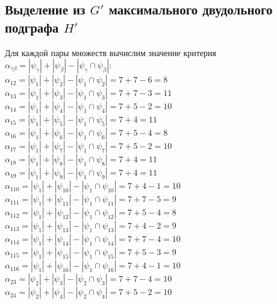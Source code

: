 \documentclass[12pt,a4paper]{report}
\begin{document}
\subsection*{Выделение из $G'$ максимального двудольного подграфа $H'$}
Для каждой пары множеств вычислим значение критерия \\
$\alpha_{\gamma\beta} = |\psi_\gamma| + |\psi_\beta| - |\psi_\gamma \cap \psi_\beta|$:\\
\hfill\break
$\alpha_{12} = |\psi_{1}| + |\psi_{2}| - |\psi_{1} \cap \psi_{2}| = 7 + 7 - 6 = 8$ \\
$\alpha_{13} = |\psi_{1}| + |\psi_{3}| - |\psi_{1} \cap \psi_{3}| = 7 + 7 - 3 = 11$ \\
$\alpha_{14} = |\psi_{1}| + |\psi_{4}| - |\psi_{1} \cap \psi_{4}| = 7 + 5 - 2 = 10$ \\
$\alpha_{15} = |\psi_{1}| + |\psi_{5}| - |\psi_{1} \cap \psi_{5}| = 7 + 4 = 11$ \\
$\alpha_{16} = |\psi_{1}| + |\psi_{6}| - |\psi_{1} \cap \psi_{6}| = 7 + 5 - 4 = 8$ \\
$\alpha_{17} = |\psi_{1}| + |\psi_{7}| - |\psi_{1} \cap \psi_{7}| = 7 + 5 - 2 = 10$ \\
$\alpha_{18} = |\psi_{1}| + |\psi_{8}| - |\psi_{1} \cap \psi_{8}| = 7 + 4 = 11$ \\
$\alpha_{19} = |\psi_{1}| + |\psi_{9}| - |\psi_{1} \cap \psi_{9}| = 7 + 4 = 11$ \\
$\alpha_{110} = |\psi_{1}| + |\psi_{10}| - |\psi_{1} \cap \psi_{10}| = 7 + 4 - 1 = 10$ \\
$\alpha_{111} = |\psi_{1}| + |\psi_{11}| - |\psi_{1} \cap \psi_{11}| = 7 + 7 - 5 = 9$ \\
$\alpha_{112} = |\psi_{1}| + |\psi_{12}| - |\psi_{1} \cap \psi_{12}| = 7 + 5 - 4 = 8$ \\
$\alpha_{113} = |\psi_{1}| + |\psi_{13}| - |\psi_{1} \cap \psi_{13}| = 7 + 4 - 2 = 9$ \\
$\alpha_{114} = |\psi_{1}| + |\psi_{14}| - |\psi_{1} \cap \psi_{14}| = 7 + 7 - 4 = 10$ \\
$\alpha_{115} = |\psi_{1}| + |\psi_{15}| - |\psi_{1} \cap \psi_{15}| = 7 + 5 - 3 = 9$ \\
$\alpha_{116} = |\psi_{1}| + |\psi_{16}| - |\psi_{1} \cap \psi_{16}| = 7 + 4 - 1 = 10$ \\
$\alpha_{23} = |\psi_{2}| + |\psi_{3}| - |\psi_{2} \cap \psi_{3}| = 7 + 7 - 4 = 10$ \\
$\alpha_{24} = |\psi_{2}| + |\psi_{4}| - |\psi_{2} \cap \psi_{4}| = 7 + 5 - 2 = 10$ \\
\end{document}
